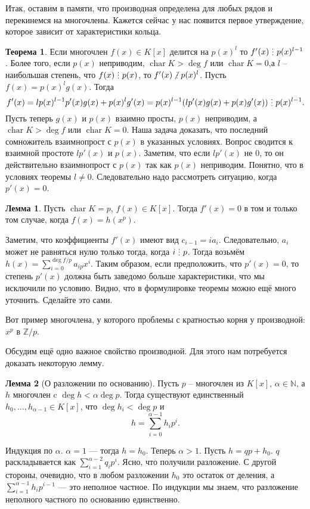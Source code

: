 \documentclass[10pt,a4paper,oneside]{book}
\theoremstyle{definition}
\newtheorem{thm}{Теорема}
\newtheorem{lem}{Лемма}
\newcommand{\mb}[1]{\mathbb{#1}}
\newcommand{\chr}{\operatorname{char}}
\newcommand{\di}{\mathop{\,\scalebox{0.85}{\raisebox{-1.2pt}[0.5\height]{\vdots}}\,}}
\newcommand{\ndi}{\mathop{\not\scalebox{0.85}{\raisebox{-1.2pt}[0.5\height]{\vdots}}\,}}
\def\thrm{\begin{thm}}
\def\ethrm{\end{thm}}
\def\lm{\begin{lem}}
\def\elm{\end{lem}}
\begin{document}
Итак, оставим в памяти, что производная определена для любых рядов и перекинемся на многочлены. Кажется сейчас у нас появится первое утверждение, которое зависит от характеристики кольца.

\thrm Если многочлен $f(x) \in K[x]$ делится на $p(x)^l$ то $f'(x) \di p(x)^{l-1}$. Более того, если $p(x)$ неприводим, $\chr K > \deg f$ или $\chr K=0$,а $l$ -- наибольшая степень, что $f(x) \di p(x)$, то $f'(x)\ndi p(x)^{l}$. 
\proof Пусть $f(x)=p(x)^lg(x)$. Тогда $$f'(x)=lp(x)^{l-1}p'(x)g(x)+p(x)^lg'(x)=p(x)^{l-1}(lp'(x)g(x)+p(x)g'(x)) \di p(x)^{l-1}.$$
Пусть теперь $g(x)$ и $p(x)$ взаимно просты, $p(x)$ неприводим, а $\chr K > \deg f$ или $\chr K=0$. Наша задача доказать, что последний сомножитель взаимнопрост с $p(x)$ в указанных условиях. Вопрос сводится к взаимной простоте $lp'(x)$ и $p(x)$. Заметим, что если $lp'(x)$ не 0, то он действительно взаимнопрост с $p(x)$ так как $p(x)$ неприводим. Понятно, что в условиях теоремы $l\neq 0$. Следовательно надо рассмотреть ситуацию, когда $p'(x)=0$. 
\lm Пусть $\chr K=p$, $f(x)\in K[x]$. Тогда $f'(x)=0$ в том и только том случае, когда $f(x)=h(x^p)$.
\elm
\proof
Заметим, что коэффициенты $f'(x)$ имеют вид $c_{i-1}=ia_{i}$. Следовательно, $a_{i}$ может не равняться нулю только тогда, когда $i\di p$. Тогда возьмём $h(x)=\sum_{i=0}^{\deg f/p} a_{ip}x^i$.
\endproof
Таким образом, если предположить, что $p'(x)=0$, то степень $p'(x)$ должна быть заведомо больше характеристики, что мы исключили по условию. Видно, что в формулировке теоремы можно ещё много уточнить. Сделайте это сами.
\endproof
\ethrm



 Вот пример многочлена, у которого проблемы с кратностью корня у производной: $x^{p}$ в $\mb Z/p$.

Обсудим ещё одно важное свойство производной. Для этого нам потребуется доказать некоторую лемму.

\lm[О разложении по основанию] Пусть $p$ -- многочлен из $K[x]$, $\alpha\in \mb N$, а $h$ многочлен c $\deg h< \alpha \deg p$. Тогда существуют единственный $h_0, \dots, h_{\alpha-1} \in K[x]$, что $\deg h_i< \deg p $ и 
$$h=\sum_{i=0}^{\alpha-1} h_i p^i.$$
\elm
\proof Индукция по $\alpha$. $\alpha=1$ --- тогда $h=h_0$. Теперь $\alpha>1$.  Пусть $h=qp+h_0$. $q$ раскладывается как $\sum_{i=1}^{\alpha-2} q_i p^i$. Ясно, что получили разложение. С другой стороны, очевидно, что в любом разложении $h_0$ это остаток от деления, а $\sum_{i=1}^{\alpha-1} h_ip^{i-1}$ --- это неполное частное.  По индукции мы знаем, что разложение неполного частного по основанию единственно. 
\endproof
\end{document}
